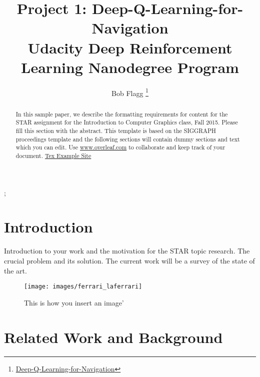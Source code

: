 \documentclass[tog]{acmsiggraph}
\title{
    Project 1: Deep-Q-Learning-for-Navigation\\
    {\large Udacity Deep Reinforcement Learning Nanodegree Program}
}
\author{
    Bob Flagg
    \thanks{
        \href{
            https://github.com/bobflagg/Deep-Q-Learning-for-Navigation}{Deep-Q-Learning-for-Navigation}
    }
}
\begin{document}


\maketitle

\begin{abstract}

In this sample paper, we describe the formatting requirements for
content for the STAR assignment for the Introduction to Computer Graphics class, Fall 2015. Please fill this section with the abstract. This template is based on the SIGGRAPH proceedings template and the following sections will contain dummy sections and text which you can edit.
Use \url{www.overleaf.com} to collaborate and keep track of your document.  \href{http://www.texample.net/tikz/resources/}{Tex Example Site}

\end{abstract}

\begin{CRcatlist}
  ;
\end{CRcatlist}

\keywordlist



\section{Introduction}

Introduction to your work and the motivation for the STAR topic research. The crucial problem and its solution. The current work will be a survey of the state of the art.
\begin{figure}[h]
	\centering
	\texttt{[image: images/ferrari\_laferrari]}
	\caption{This is how you insert an image'}
	\label{fig:ferrari}
\end{figure}


\section{Related Work and Background}
\end{document}

